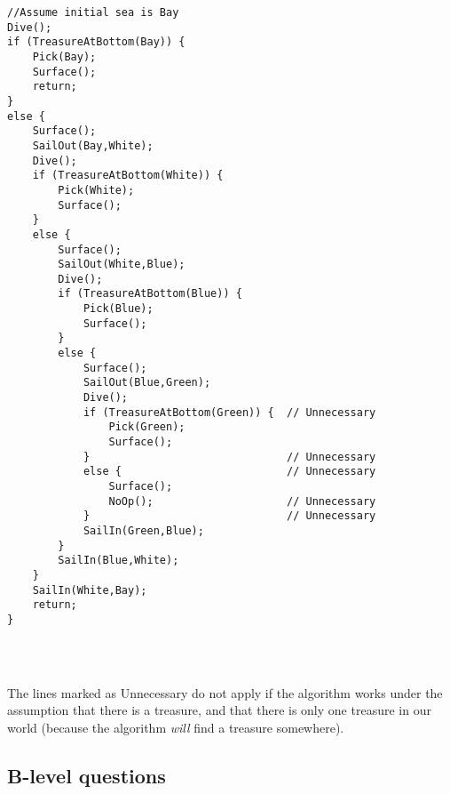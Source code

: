 \documentclass[a4paper, 11pt]{article}
\begin{document}
\begin{lstlisting}
//Assume initial sea is Bay
Dive();
if (TreasureAtBottom(Bay)) {
    Pick(Bay); 
    Surface();
    return;
}
else {
    Surface();
    SailOut(Bay,White);
    Dive();
    if (TreasureAtBottom(White)) {
        Pick(White); 
        Surface();
    }
    else {
        Surface();
        SailOut(White,Blue);
        Dive();
        if (TreasureAtBottom(Blue)) {
            Pick(Blue); 
            Surface();
        }
        else {
            Surface();
            SailOut(Blue,Green);
            Dive(); 
            if (TreasureAtBottom(Green)) { 	// Unnecessary
                Pick(Green); 
                Surface();
            }                               // Unnecessary
            else {                          // Unnecessary
                Surface();   
                NoOp();                     // Unnecessary
            }                               // Unnecessary
            SailIn(Green,Blue);
        }
        SailIn(Blue,White);
    }
    SailIn(White,Bay);
    return;
}




\end{lstlisting}

The lines marked as Unnecessary do not apply if the algorithm works under the assumption that there is a treasure, and that there is only one treasure in our world (because the algorithm \textit{will} find a treasure somewhere). \\

\subsection{B-level questions}
\end{document}
